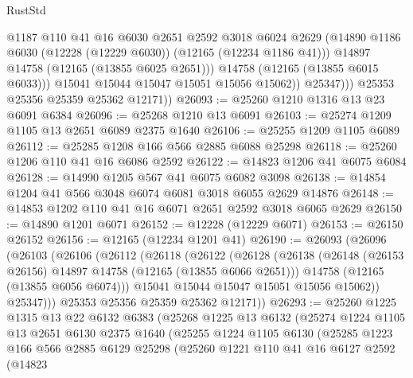 \begin{lexlean}{RustStd}
\begin{coremodule}
                      @1187
                      @110
                      @41
                      @16
                      @6030
                      @2651
                      @2592
                      @3018
                      @6024
                      @2629
                      (@14890 @1186 @6030 (@12228 (@12229 @6030)) (@12165 (@12234 @1186 @41)))
                      @14897
                      @14758
                      (@12165 (@13855 @6025 @2651)))
                    @14758
                    (@12165 (@13855 @6015 @6033)))
                  @15041
                  @15044
                  @15047
                  @15051
                  @15056
                  @15062))
              @25347)))
        @25353
        @25356
        @25359
        @25362
        @12171))
@26093 := @25260 @1210 @1316 @13 @23 @6091 @6384
@26096 := @25268 @1210 @13 @6091
@26103 := @25274 @1209 @1105 @13 @2651 @6089 @2375 @1640
@26106 := @25255 @1209 @1105 @6089
@26112 := @25285 @1208 @166 @566 @2885 @6088 @25298
@26118 := @25260 @1206 @110 @41 @16 @6086 @2592
@26122 := @14823 @1206 @41 @6075 @6084
@26128 := @14990 @1205 @567 @41 @6075 @6082 @3098
@26138 := @14854 @1204 @41 @566 @3048 @6074 @6081 @3018 @6055 @2629 @14876
@26148 := @14853 @1202 @110 @41 @16 @6071 @2651 @2592 @3018 @6065 @2629
@26150 := @14890 @1201 @6071
@26152 := @12228 (@12229 @6071)
@26153 := @26150 @26152
@26156 := @12165 (@12234 @1201 @41)
@26190 := @26093
    (@26096
      (@26103
        (@26106
          (@26112
            (@26118
              (@26122
                (@26128
                  (@26138
                    (@26148 (@26153 @26156) @14897 @14758 (@12165 (@13855 @6066 @2651)))
                    @14758
                    (@12165 (@13855 @6056 @6074)))
                  @15041
                  @15044
                  @15047
                  @15051
                  @15056
                  @15062))
              @25347)))
        @25353
        @25356
        @25359
        @25362
        @12171))
@26293 := @25260
    @1225
    @1315
    @13
    @22
    @6132
    @6383
    (@25268
      @1225
      @13
      @6132
      (@25274
        @1224
        @1105
        @13
        @2651
        @6130
        @2375
        @1640
        (@25255
          @1224
          @1105
          @6130
          (@25285
            @1223
            @166
            @566
            @2885
            @6129
            @25298
            (@25260
              @1221
              @110
              @41
              @16
              @6127
              @2592
              (@14823

\end{coremodule}
\end{lexlean}
